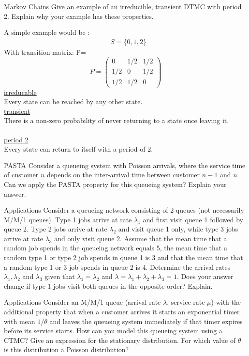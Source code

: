 \begin{problem}{Markov Chains}
Give an example of an irreducible, transient DTMC with period 2. Explain why your example has these properties.
\end{problem}
\begin{solution}
    A simple example would be :
    \begin{align*}
        &S=\{0,1,2\}
    \end{align*}
    With transition matrix:
    P=
    \[
        P = \begin{pmatrix}
                0 & 1/2 & 1/2 \\
                1/2 & 0 &1/2  \\
                1/2 & 1/2 & 0
        \end{pmatrix}
    \]
    \underline{irreducable}\\
    Every state can be reached by any other state.\\
    \underline{transient}\\
    There is a non-zero probability of never returning to a state once leaving it.\\
    \\
    \underline{period 2}\\
    Every state can return to itself with a period of 2.
\end{solution}
\begin{problem}{PASTA}
Consider a queueing system with Poisson arrivals, where the service time of customer \( n \) depends on the inter-arrival time between customer \( n - 1 \) and \( n \). Can we apply the PASTA property for this queueing system? Explain your answer.
\end{problem}

\begin{problem}{Applications}
Consider a queueing network consisting of 2 queues (not necessarily M/M/1 queues). Type 1 jobs arrive at rate \( \lambda_1 \) and first visit queue 1 followed by queue 2. Type 2 jobs arrive at rate \( \lambda_2 \) and visit queue 1 only, while type 3 jobs arrive at rate \( \lambda_3 \) and only visit queue 2. Assume that the mean time that a random job spends in the queueing network equals 5, the mean time that a random type 1 or type 2 job spends in queue 1 is 3 and that the mean time that a random type 1 or 3 job spends in queue 2 is 4. Determine the arrival rates \( \lambda_1, \lambda_2 \) and \( \lambda_3 \) given that \( \lambda_1 = \lambda_2 \) and \( \lambda = \lambda_1 + \lambda_2 + \lambda_3 = 1 \). Does your answer change if type 1 jobs visit both queues in the opposite order? Explain.
\end{problem}

\begin{problem}{Applications}
Consider an M/M/1 queue (arrival rate \( \lambda \), service rate \( \mu \)) with the additional property that when a customer arrives it starts an exponential timer with mean \( 1/\theta \) and leaves the queueing system immediately if that timer expires before its service starts. How can you model this queueing system using a CTMC? Give an expression for the stationary distribution. For which value of \( \theta \) is this distribution a Poisson distribution?
\end{problem}
